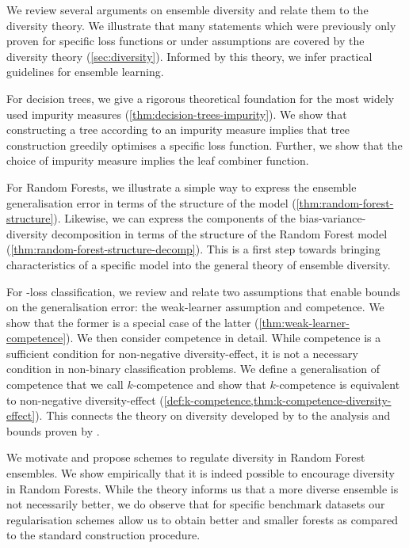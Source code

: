 \documentclass[
	twoside=false, %
]{kaobook}
\begin{document}
We review several arguments on ensemble diversity and relate them to the diversity theory. We illustrate that many statements which were previously only proven for specific loss functions or under assumptions are covered by the diversity theory (\cf \cref{sec:diversity}). Informed by this theory, we infer practical guidelines for ensemble learning.

For decision trees, we give a rigorous theoretical foundation for the most widely used impurity measures (\cf \ref{thm:decision-trees-impurity}).  We show that constructing a tree according to an impurity measure implies that tree construction greedily optimises a specific loss function. Further, we show that the choice of impurity measure implies the leaf combiner function.

For Random Forests, we illustrate a simple way to express the ensemble generalisation error in terms of the structure of the model (\cf \ref{thm:random-forest-structure}). Likewise, we can express the components of the bias-variance-diversity decomposition in terms of the structure of the Random Forest model (\cf \ref{thm:random-forest-structure-decomp}). This is a first step towards bringing characteristics of a specific model into the general theory of ensemble diversity. 

For \zeroone-loss classification, we review and relate two assumptions that enable bounds on the generalisation error: the weak-learner assumption and competence. We show that the former is a special case of the latter (\cf \ref{thm:weak-learner-competence}). We then consider competence in detail. While competence is a sufficient condition for non-negative diversity-effect, it is not a necessary condition in non-binary classification problems. We define a generalisation of competence that we call $k$-competence and show that $k$-competence is equivalent to non-negative diversity-effect (\cf \cref{def:k-competence,thm:k-competence-diversity-effect}). This connects the theory on diversity developed by \citeauthor{wood_UnifiedTheoryDiversity_2023} \cite{wood_UnifiedTheoryDiversity_2023} to the analysis and bounds proven by \citeauthor{theisen_WhenAreEnsembles_2023} \cite{theisen_WhenAreEnsembles_2023}.

We motivate and propose schemes to regulate diversity in Random Forest ensembles. We show empirically that it is indeed possible to encourage diversity in Random Forests. While the theory informs us that a more diverse ensemble is not necessarily better, we do observe that for specific benchmark datasets our regularisation schemes allow us to obtain better and smaller forests as compared to the standard construction procedure.
\end{document}
